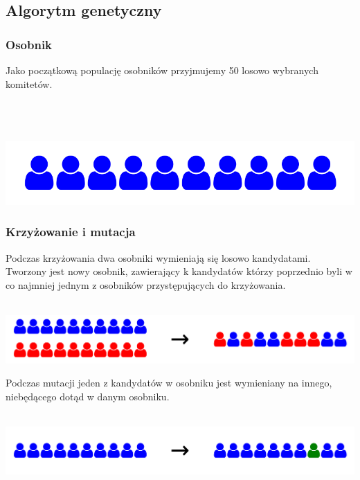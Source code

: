 \documentclass{beamer}
\begin{document}

\subsection{Algorytm genetyczny}

\begin{frame}
\frametitle{Osobnik}
Jako początkową populację osobników przyjmujemy 50 losowo wybranych komitetów.

~ \\ ~ \\ ~ \\

\includegraphics[width=0.8\paperwidth]{pics/committee.png}


\end{frame}



\begin{frame}
\frametitle{Krzyżowanie i mutacja}
Podczas krzyżowania dwa osobniki wymieniają się losowo kandydatami. Tworzony jest nowy osobnik, zawierający k kandydatów którzy poprzednio byli w co najmniej jednym z osobników przystępujących do krzyżowania.

~ \\ 

\includegraphics[width=0.8\paperwidth]{pics/crossing.png}

Podczas mutacji jeden z kandydatów w osobniku jest wymieniany na innego, niebędącego dotąd w danym osobniku.

~ \\

\includegraphics[width=0.8\paperwidth]{pics/mutation.png}

\end{frame}
\end{document}
